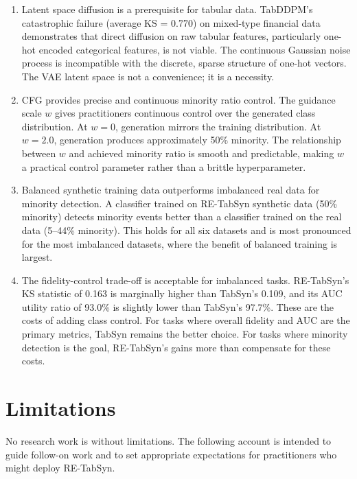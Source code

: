 \begin{enumerate}
    \item Latent space diffusion is a prerequisite for tabular data. TabDDPM's catastrophic failure (average KS = 0.770) on mixed-type financial data demonstrates that direct diffusion on raw tabular features, particularly one-hot encoded categorical features, is not viable. The continuous Gaussian noise process is incompatible with the discrete, sparse structure of one-hot vectors. The VAE latent space is not a convenience; it is a necessity.

    \item CFG provides precise and continuous minority ratio control. The guidance scale $w$ gives practitioners continuous control over the generated class distribution. At $w = 0$, generation mirrors the training distribution. At $w = 2.0$, generation produces approximately 50\% minority. The relationship between $w$ and achieved minority ratio is smooth and predictable, making $w$ a practical control parameter rather than a brittle hyperparameter.

    \item Balanced synthetic training data outperforms imbalanced real data for minority detection. A classifier trained on RE-TabSyn synthetic data (50\% minority) detects minority events better than a classifier trained on the real data (5--44\% minority). This holds for all six datasets and is most pronounced for the most imbalanced datasets, where the benefit of balanced training is largest.

    \item The fidelity-control trade-off is acceptable for imbalanced tasks. RE-TabSyn's KS statistic of 0.163 is marginally higher than TabSyn's 0.109, and its AUC utility ratio of 93.0\% is slightly lower than TabSyn's 97.7\%. These are the costs of adding class control. For tasks where overall fidelity and AUC are the primary metrics, TabSyn remains the better choice. For tasks where minority detection is the goal, RE-TabSyn's gains more than compensate for these costs.
\end{enumerate}

\section{Limitations}

No research work is without limitations. The following account is intended to guide follow-on work and to set appropriate expectations for practitioners who might deploy RE-TabSyn.

